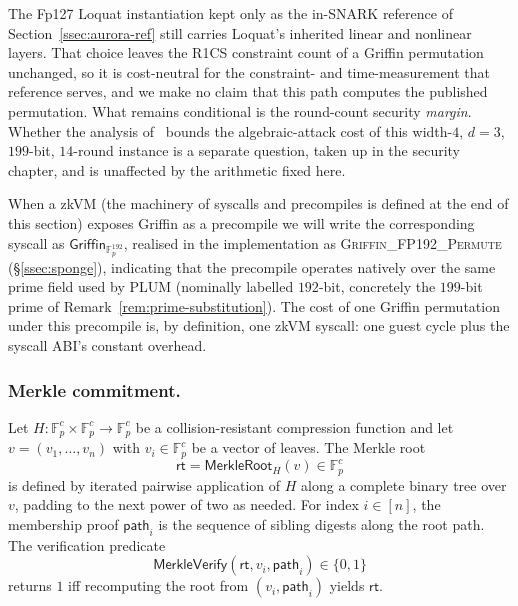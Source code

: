 The Fp127 Loquat instantiation kept only as the in-SNARK reference of Section~\ref{ssec:aurora-ref} still carries Loquat's inherited linear and nonlinear layers. That choice leaves the R1CS constraint count of a Griffin permutation unchanged, so it is cost-neutral for the constraint- and time-measurement that reference serves, and we make no claim that this path computes the published permutation. What remains conditional is the round-count security \emph{margin}. Whether the analysis of~\cite{cryptoeprint:2022/403} bounds the algebraic-attack cost of this width-$4$, $d=3$, $199$-bit, $14$-round instance is a separate question, taken up in the security chapter, and is unaffected by the arithmetic fixed here.

When a zkVM (the machinery of syscalls and precompiles is defined at the end of this section) exposes Griffin as a precompile we will write the corresponding syscall as $\mathsf{Griffin}_{\mathbb{F}_p^{192}}$, realised in the implementation as \textsc{Griffin\_FP192\_Permute} (\S\ref{ssec:sponge}), indicating that the precompile operates natively over the same prime field used by PLUM (nominally labelled $192$-bit, concretely the $199$-bit prime of Remark~\ref{rem:prime-substitution}). The cost of one Griffin permutation under this precompile is, by definition, one zkVM syscall: one guest cycle plus the syscall ABI's constant overhead.

\subsubsection{Merkle commitment.}
\begin{definition}\label{def:merkle}
Let $H:\mathbb{F}_p^{c}\times\mathbb{F}_p^{c}\to\mathbb{F}_p^{c}$ be a collision-resistant compression function and let $v=(v_1,\ldots,v_n)$ with $v_i\in\mathbb{F}_p^{c}$ be a vector of leaves. The Merkle root
\begin{equation*}
  \mathsf{rt}=\mathsf{MerkleRoot}_H(v)\in\mathbb{F}_p^{c}
\end{equation*}
is defined by iterated pairwise application of $H$ along a complete binary tree over $v$, padding to the next power of two as needed. For index $i\in[n]$, the membership proof $\mathsf{path}_i$ is the sequence of sibling digests along the root path. The verification predicate
\begin{equation*}
  \mathsf{MerkleVerify}(\mathsf{rt},v_i,\mathsf{path}_i)\in\{0,1\}
\end{equation*}
returns $1$ iff recomputing the root from $(v_i,\mathsf{path}_i)$ yields $\mathsf{rt}$.
\end{definition}

